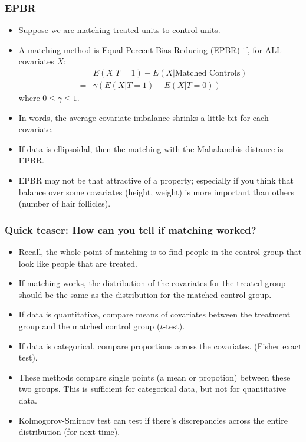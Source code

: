 \documentclass{beamer}
\begin{document}
\begin{frame}[c]\frametitle{EPBR}
  \begin{itemize}
    \item<1-> Suppose we are matching treated units to control units.
    \item<1-> A matching method is Equal Percent Bias Reducing (EPBR) if,
     for ALL covariates $X$:
     \begin{eqnarray*}
       &&E(X | T = 1) - E(X | \text{Matched Controls})\\
       & = & \gamma(E(X | T = 1) - E(X |  T = 0))
     \end{eqnarray*}
     where $0 \leq \gamma \leq 1$.
    \item<1-> In words, the average covariate imbalance 
      shrinks a little bit for each covariate.
    \item<2-> If data is ellipsoidal, then the matching with the Mahalanobis distance 
      is EPBR.
    \item<3-> EPBR may not be that attractive of a property; especially if you think that
      balance over some covariates (height, weight) is more important than others (number
      of hair follicles).
  \end{itemize}	
\end{frame}

\begin{frame}[c]\frametitle{Quick teaser:  How can you tell if matching worked?}
  \begin{itemize}
    \item<1-> Recall, the whole point of matching is to find people in the control
      group that look like people that are treated.
    \item<1-> If matching works, 
      the distribution of the covariates for the treated group should be the same
      as the distribution for the matched control group.
    \item<2-> If data is quantitative, 
      compare means of covariates between the treatment 
      group and the matched control group ($t$-test).  
    \item<2->  If data is categorical, compare proportions across the covariates.
      (Fisher exact test).
    \item<2->  These methods compare single points (a mean or propotion)
      between these two groups.  This is sufficient for categorical data, 
      but not for quantitative data.
    \item<3->  Kolmogorov-Smirnov test can test if there's discrepancies
      across the entire distribution (for next time).
  \end{itemize}	
\end{frame}
\end{document}
